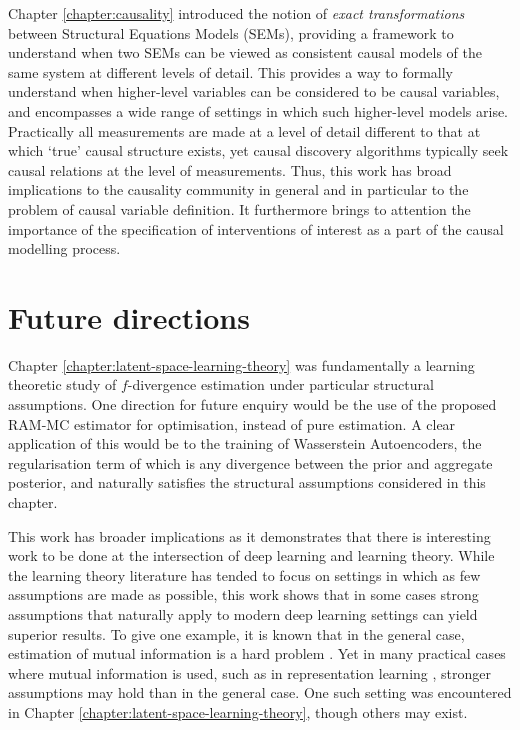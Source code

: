 Chapter \ref{chapter:causality} introduced the notion of \emph{exact transformations} between Structural Equations Models (SEMs), providing a framework to understand when two SEMs can be viewed as consistent causal models of the same system at different levels of detail. 
This provides a way to formally understand when higher-level variables can be considered to be causal variables, and encompasses a wide range of settings in which such higher-level models arise.
Practically all measurements are made at a level of detail different to that at which `true' causal structure exists, yet causal discovery algorithms typically seek causal relations at the level of measurements.
Thus, this work has broad implications to the causality community in general and in particular to the problem of causal variable definition.
It furthermore brings to attention the importance of the specification of interventions of interest as a part of the causal modelling process.


\section{Future directions}

Chapter \ref{chapter:latent-space-learning-theory} was fundamentally a learning theoretic study of $f$-divergence estimation under particular structural assumptions. 
One direction for future enquiry would be the use of the proposed RAM-MC estimator for optimisation, instead of pure estimation. 
A clear application of this would be to the training of Wasserstein Autoencoders, the regularisation term of which is any divergence between the prior and aggregate posterior, and naturally satisfies the structural assumptions considered in this chapter.

This work has broader implications as it demonstrates that there is interesting work to be done at the intersection of deep learning and learning theory. 
While the learning theory literature has tended to focus on settings in which as few assumptions are made as possible, this work shows that in some cases strong assumptions that naturally apply to modern deep learning settings can yield superior results.
To give one example, it is known that in the general case, estimation of mutual information is a hard problem \citep{mcallester2018formal}.
Yet in many practical cases where mutual information is used, such as in representation learning \citep{hjelm2018learning, oord2018representation, tschannen2020onmutual}, stronger assumptions may hold than in the general case.
One such setting was encountered in Chapter \ref{chapter:latent-space-learning-theory}, though others may exist.

